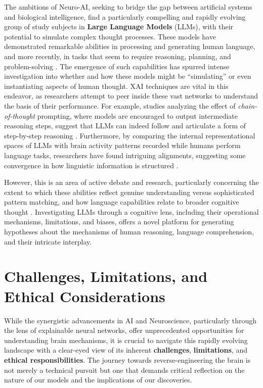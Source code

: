 The ambitions of Neuro-AI, seeking to bridge the gap between artificial systems and biological intelligence, find a particularly compelling and rapidly evolving group of study subjects in \textbf{Large Language Models} (LLMs), with their potential to simulate complex thought processes. These models have demonstrated remarkable abilities in processing and generating human language, and more recently, in tasks that seem to require reasoning, planning, and problem-solving \cite{wei2022chain}. The emergence of such capabilities has spurred intense investigation into whether and how these models might be ``simulating'' or even instantiating aspects of human thought. XAI techniques are vital in this endeavor, as researchers attempt to peer inside these vast networks to understand the basis of their performance. For example, studies analyzing the effect of \textit{chain-of-thought} prompting, where models are encouraged to output intermediate reasoning steps, suggest that LLMs can indeed follow and articulate a form of step-by-step reasoning \cite{wei2022chain}. Furthermore, by comparing the internal representational spaces of LLMs with brain activity patterns recorded while humans perform language tasks, researchers have found intriguing alignments, suggesting some convergence in how linguistic information is structured \cite{caucheteux2022brains, toneva2019interpreting}.

However, this is an area of active debate and research, particularly concerning the extent to which these abilities reflect genuine understanding versus sophisticated pattern matching, and how language capabilities relate to broader cognitive thought \cite{mahowald2023dissociating, binz2023using}. Investigating LLMs through a cognitive lens, including their operational mechanisms, limitations, and biases, offers a novel platform for generating hypotheses about the mechanisms of human reasoning, language comprehension, and their intricate interplay.

\section{Challenges, Limitations, and Ethical Considerations}

While the synergistic advancements in AI and Neuroscience, particularly through the lens of explainable neural networks, offer unprecedented opportunities for understanding brain mechanisms, it is crucial to navigate this rapidly evolving landscape with a clear-eyed view of its inherent \textbf{challenges}, \textbf{limitations}, and \textbf{ethical responsibilities}. The journey towards reverse-engineering the brain is not merely a technical pursuit but one that demands critical reflection on the nature of our models and the implications of our discoveries.


